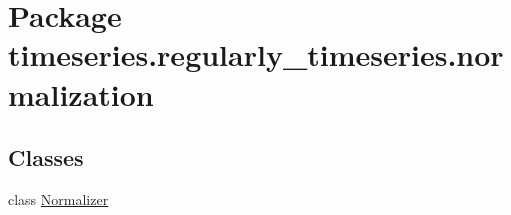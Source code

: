 \hypertarget{namespacetimeseries_1_1regularly__timeseries_1_1normalization}{}\section{Package timeseries.\+regularly\+\_\+timeseries.\+normalization}
\label{namespacetimeseries_1_1regularly__timeseries_1_1normalization}
\subsection*{Classes}
\begin{DoxyCompactItemize}
\item 
class \hyperlink{classtimeseries_1_1regularly__timeseries_1_1normalization_1_1_normalizer}{Normalizer}
\end{DoxyCompactItemize}
